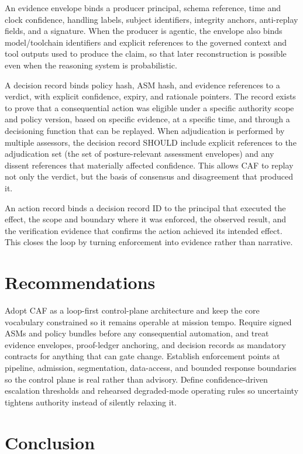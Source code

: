 \documentclass[11pt]{article}
\begin{document}
An evidence envelope binds a producer principal, schema reference, time and clock confidence, handling labels, subject identifiers, integrity anchors, anti-replay fields, and a signature. When the producer is agentic, the envelope also binds model/toolchain identifiers and explicit references to the governed context and tool outputs used to produce the claim, so that later reconstruction is possible even when the reasoning system is probabilistic.

A decision record binds policy hash, ASM hash, and evidence references to a verdict, with explicit confidence, expiry, and rationale pointers. The record exists to prove that a consequential action was eligible under a specific authority scope and policy version, based on specific evidence, at a specific time, and through a decisioning function that can be replayed. When adjudication is performed by multiple assessors, the decision record SHOULD include explicit references to the adjudication set (the set of posture-relevant assessment envelopes) and any dissent references that materially affected confidence. This allows CAF to replay not only the verdict, but the basis of consensus and disagreement that produced it.

An action record binds a decision record ID to the principal that executed the effect, the scope and boundary where it was enforced, the observed result, and the verification evidence that confirms the action achieved its intended effect. This closes the loop by turning enforcement into evidence rather than narrative.


\section{Recommendations}

Adopt CAF as a loop-first control-plane architecture and keep the core vocabulary constrained so it remains operable at mission tempo. Require signed ASMs and policy bundles before any consequential automation, and treat evidence envelopes, proof-ledger anchoring, and decision records as mandatory contracts for anything that can gate change. Establish enforcement points at pipeline, admission, segmentation, data-access, and bounded response boundaries so the control plane is real rather than advisory. Define confidence-driven escalation thresholds and rehearsed degraded-mode operating rules so uncertainty tightens authority instead of silently relaxing it.

\section{Conclusion}
\end{document}
